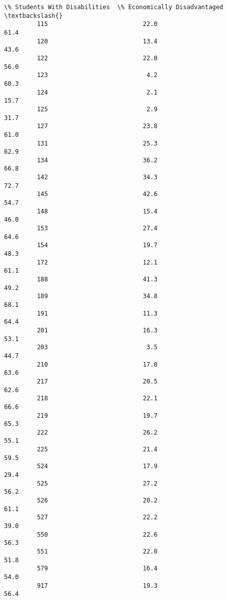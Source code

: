 \documentclass[11pt]{article}
\begin{document}
\begin{Verbatim}[commandchars=\\\{\}]
              \% Students With Disabilities  \% Economically Disadvantaged  \textbackslash{}
         115                          22.0                          61.4   
         120                          13.4                          43.6   
         122                          22.0                          56.0   
         123                           4.2                          60.3   
         124                           2.1                          15.7   
         125                           2.9                          31.7   
         127                          23.8                          61.0   
         131                          25.3                          62.9   
         134                          36.2                          66.8   
         142                          34.3                          72.7   
         145                          42.6                          54.7   
         148                          15.4                          46.0   
         153                          27.4                          64.6   
         154                          19.7                          48.3   
         172                          12.1                          61.1   
         188                          41.3                          49.2   
         189                          34.8                          68.1   
         191                          11.3                          64.4   
         201                          16.3                          53.1   
         203                           3.5                          44.7   
         210                          17.0                          63.6   
         217                          20.5                          62.6   
         218                          22.1                          66.6   
         219                          19.7                          65.3   
         222                          26.2                          55.1   
         225                          21.4                          59.5   
         524                          17.9                          29.4   
         525                          27.2                          56.2   
         526                          20.2                          61.1   
         527                          22.2                          39.0   
         550                          22.6                          56.3   
         551                          22.0                          51.8   
         579                          16.4                          54.0   
         917                          19.3                          56.4   
         

\end{Verbatim}
\end{document}
